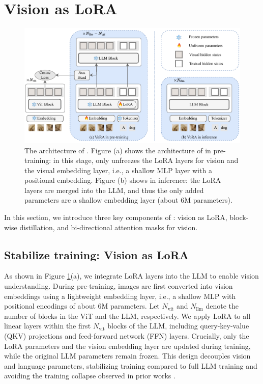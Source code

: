 \section{Vision as LoRA}
\label{sec:methods}
\begin{figure}
    \centering
    \includegraphics[width=\linewidth]{images/Figure2.pdf}
    \caption{The architecture of \model{}. Figure (a) shows the architecture of \model{} in pre-training: in this stage, \model{} only unfreezes the LoRA layers for vision and the visual embedding layer, i.e., a shallow MLP layer with a positional embedding. Figure (b) shows \model{} in inference: the LoRA layers are merged into the LLM, and thus the only added parameters are a shallow embedding layer (about 6M parameters).}
    \label{fig:architecture}
\end{figure}
In this section, we introduce three key components of \model{}: vision as LoRA, block-wise distillation, and bi-directional attention masks for vision. 

\subsection{Stabilize training: Vision as LoRA}

As shown in Figure \ref{fig:architecture}(a), we integrate LoRA layers into the LLM to enable vision understanding. During pre-training, images are first converted into vision embeddings using a lightweight embedding layer, i.e., a shallow MLP with positional encodings of about 6M parameters. Let $N_{\text{vit}}$ and $N_{\text{llm}}$ denote the number of blocks in the ViT and the LLM, respectively. We apply LoRA to all linear layers within the first $N_{\text{vit}}$ blocks of the LLM, including query-key-value (QKV) projections and feed-forward network (FFN) layers. Crucially, only the LoRA parameters and the vision embedding layer are updated during training, while the original LLM parameters remain frozen. This design decouples vision and language parameters, stabilizing training compared to full LLM training and avoiding the training collapse observed in prior works \cite{eve}.

